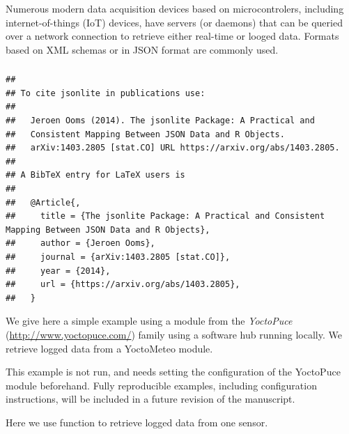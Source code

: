 \documentclass[krantz2]{krantz}\usepackage{knitr}%
\newcommand{\href}[2]{\emph{#2} (\url{#1})}
\begin{document}
Numerous modern data acquisition devices based on microcontrolers, including internet-of-things (IoT) devices, have servers (or daemons) that can be queried over a network connection to retrieve either real-time or looged data. Formats based on XML schemas or in JSON format are commonly used.

\subsubsection[jsonlite]{}

\begin{knitrout}\footnotesize
{}\color{fgcolor}\begin{kframe}
\begin{alltt}
\hlstd{(} \hlstd{=} \hlstd{)}
\end{alltt}
\begin{verbatim}
## 
## To cite jsonlite in publications use:
## 
##   Jeroen Ooms (2014). The jsonlite Package: A Practical and
##   Consistent Mapping Between JSON Data and R Objects.
##   arXiv:1403.2805 [stat.CO] URL https://arxiv.org/abs/1403.2805.
## 
## A BibTeX entry for LaTeX users is
## 
##   @Article{,
##     title = {The jsonlite Package: A Practical and Consistent Mapping Between JSON Data and R Objects},
##     author = {Jeroen Ooms},
##     journal = {arXiv:1403.2805 [stat.CO]},
##     year = {2014},
##     url = {https://arxiv.org/abs/1403.2805},
##   }
\end{verbatim}
\end{kframe}
\end{knitrout}

We give here a simple example using a module from the \href{http://www.yoctopuce.com/}{YoctoPuce} family using a software hub running locally. We retrieve logged data from a YoctoMeteo module.

\begin{infobox}
This example is not run, and needs setting the configuration of the YoctoPuce module beforehand. Fully reproducible examples, including configuration instructions, will be included in a future revision of the manuscript.
\end{infobox}

Here we use function  to retrieve logged data from one sensor.

\begin{knitrout}\footnotesize
{}\color{fgcolor}\begin{kframe}
\begin{alltt}
 \hlkwb{<-} 
 \hlkwb{<-}
    \hlstd{(} \hlstd{,}
                    \hlstd{=} \hlstd{))}
\end{alltt}
\end{kframe}
\end{knitrout}
\end{document}
